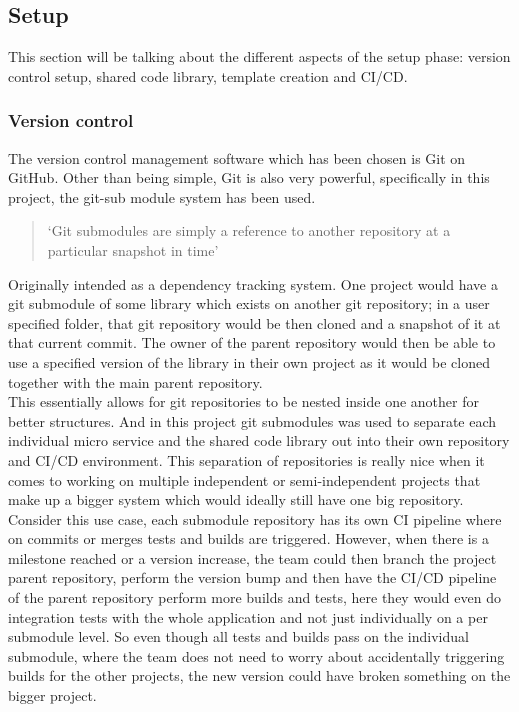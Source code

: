 \documentclass{article}
\newcommand{\vspaceconst}{-2ex}
\begin{document}
\begin{multicols}{2}
\subsection{Setup}
\vspace{\vspaceconst}
This section will be talking about the different aspects of the setup phase: version control setup, shared code library, template creation and CI/CD.\@

\subsubsection{Version control}
\vspace{\vspaceconst}
The version control management software which has been chosen is Git on GitHub. Other than being simple, Git is also very powerful, specifically in this project, the git-sub module system has been used.  
\begin{quote}
  `Git submodules are simply a reference to another repository at a particular snapshot in time'\cite{atlasianGitSubmodule}
\end{quote}
Originally intended as a dependency tracking system. One project would have a git submodule of some library which exists on another git repository; in a user specified folder, that git repository would be then cloned and a snapshot of it at that current commit. The owner of the parent repository would then be able to use a specified version of the library in their own project as it would be cloned together with the main parent repository.\\
This essentially allows for git repositories to be nested inside one another for better structures. And in this project git submodules was used to separate each individual micro service and the shared code library out into their own repository and CI/CD environment. This separation of repositories is really nice when it comes to working on multiple independent or semi-independent projects that make up a bigger system which would ideally still have one big repository.\\
Consider this use case, each submodule repository has its own CI pipeline where on commits or merges tests and builds are triggered. However, when there is a milestone reached or a version increase, the team could then branch the project parent repository, perform the version bump and then have the CI/CD pipeline of the parent repository perform more builds and tests, here they would even do integration tests with the whole application and not just individually on a per submodule level. So even though all tests and builds pass on the individual submodule, where the team does not need to worry about accidentally triggering builds for the other projects, the new version could have broken something on the bigger project.\\


\end{multicols}
\end{document}
